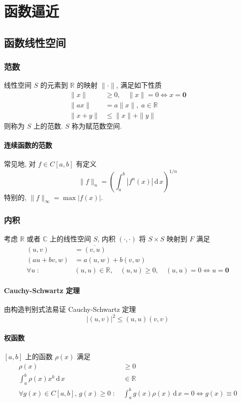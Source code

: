 \documentclass{ctexart}
\newcommand{\Rset}{\mathbb{R}}
\newcommand{\Cset}{\mathbb{C}}
\newcommand{\ud}{\,\mathrm{d}\,}
\begin{document}
\section{函数逼近}
\subsection{函数线性空间}
\subsubsection{范数}
    线性空间 $S$ 的元素到 $\Rset$ 的映射 $\|\cdot\|$, 满足如下性质 \begin{align*}
        \| x \| & \ge 0,\quad \|x\| = 0 \Leftrightarrow x = \mathbf{0}\\
        \|ax\| &= a\|x\|,\; a \in \Rset\\
        \|x+y\| &\le \|x\| + \|y\|
    \end{align*} 则称为 $S$ 上的范数. $S$ 称为赋范数空间.\par
\paragraph{连续函数的范数}
    常见地, 对 $f \in C[a,b]$ 有定义 \[
        \| f \|_n = \left(\int_a^b |f^n(x)| \ud x\right)^{1/n}\]
    特别的, $\|f\|_{\infty} = \max |f(x)|$.

\subsubsection{内积}
    考虑 $\Rset$ 或者 $\Cset$ 上的线性空间 $S$,
    内积 $(\cdot, \cdot)$ 将 $S\times S$ 映射到 $F$ 满足
    \begin{align*}
        (u,v) &= \overline{(v,u)}\\
        (au+bv, w) &= a(u,w) + b(v,w)\\
        \forall u\;:\;&(u,u) \in \Rset,\quad (u,u) \ge 0,\quad (u,u) = 0 \Leftrightarrow u = \mathbf{0}
    \end{align*}
\paragraph{Cauchy-Schwartz 定理}
    由构造判别式法易证 Cauchy-Schwartz 定理 \[
        |(u,v)|^2 \le (u,u)(v,v)\]
\paragraph{权函数}
    $[a,b]$ 上的函数 $\rho(x)$ 满足 \begin{align*}
        \rho(x) &\ge 0\\
        \int_a^b \rho(x) x^k \ud x &\in \Rset\\
        \forall g(x) \in C[a,b],\,g(x)\ge 0\;:\;&
            \int_a^b g(x)\rho(x) \ud x = 0 \Leftrightarrow g(x) \equiv 0
    \end{align*}
\end{document}
